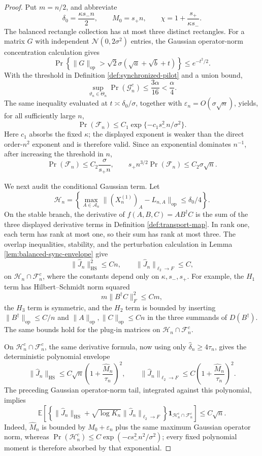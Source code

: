 \documentclass{article}
\begin{document}
\begin{proof}
Put \(m=n/2\), and abbreviate
\[
\delta_0=\frac{\kappa s_-n}{2},
\qquad
M_0=s_+n,
\qquad
\chi=1+\frac{s_+}{\kappa s_-}.
\]
The balanced rectangle collection has at most three distinct rectangles.  For a matrix \(G\) with independent \(\mathcal N(0,2\sigma^2)\) entries, the Gaussian operator-norm concentration calculation gives
\[
\Pr\!\left\{\lVert G\rVert_{\mathrm{op}}>
\sqrt2\sigma(\sqrt a+\sqrt b+t)\right\}\le e^{-t^2/2}.
\]
With the threshold in Definition \ref{def:synchronized-pilot} and a union bound,
\[
\sup_{\vartheta_n\in\Theta_n}\Pr(\mathcal G_n^c)
\le\frac{3\alpha}{16}<\frac{\alpha}{4}.
\]
The same inequality evaluated at \(t\asymp\delta_0/\sigma\), together with
\(\varepsilon_n=O(\sigma\sqrt n)\), yields, for all sufficiently large \(n\),
\[
\Pr(\mathcal F_n)
\le C_1\exp\{-c_1s_-^2n/\sigma^2\}.
\]
Here \(c_1\) absorbs the fixed \(\kappa\); the displayed exponent is weaker than the direct order-\(n^2\) exponent and is therefore valid.  Since an exponential dominates \(n^{-1}\), after increasing the threshold in \(n\),
\[
\Pr(\mathcal F_n)\le C_2\frac{\sigma}{s_+n},
\qquad
s_+n^{3/2}\Pr(\mathcal F_n)\le C_2\sigma\sqrt n.
\]

We next audit the conditional Gaussian term.  Let
\[
\mathcal H_n=
\left\{\max_{A\in\mathcal A_n}
\lVert(X_n^{(1)})_A-L_{n,A}\rVert_{\mathrm{op}}
\le\delta_0/4\right\}.
\]
On the stable branch, the derivative of
\(f(A,B,C)=AB^{\dagger}C\) is the sum of the three displayed derivative terms in Definition \ref{def:transport-map}.  In rank one, each term has rank at most one, so their sum has rank at most three.  The overlap inequalities, stability, and the perturbation calculation in Lemma \ref{lem:balanced-sync-envelope} give
\[
\lVert\widehat J_n\rVert_{\mathrm{HS}}^2\le Cn,
\qquad
\lVert\widehat J_n\rVert_{\ell_2\to F}\le C,
\]
on \(\mathcal H_n\cap\mathcal F_n^c\), where the constants depend only on
\(\kappa,s_-,s_+\).  For example, the \(H_1\) term has Hilbert--Schmidt norm squared
\[
m\lVert B^{\dagger}C\rVert_F^2\le Cm,
\]
the \(H_3\) term is symmetric, and the \(H_2\) term is bounded by inserting
\(\lVert B^{\dagger}\rVert_{\mathrm{op}}\le C/n\) and
\(\lVert A\rVert_{\mathrm{op}},\lVert C\rVert_{\mathrm{op}}\le Cn\)
in the three summands of \(D(B^{\dagger})\).  The same bounds hold for the plug-in matrices on \(\mathcal H_n\cap\mathcal F_n^c\).

On \(\mathcal H_n^c\cap\mathcal F_n^c\), the same derivative formula, now using only
\(\widehat\delta_n\ge4\tau_n\), gives the deterministic polynomial envelope
\[
\lVert\widehat J_n\rVert_{\mathrm{HS}}
\le C\sqrt n\left(1+\frac{\widehat M_n}{\tau_n}\right)^2,
\qquad
\lVert\widehat J_n\rVert_{\ell_2\to F}
\le C\left(1+\frac{\widehat M_n}{\tau_n}\right)^2.
\]
The preceding Gaussian operator-norm tail, integrated against this polynomial, implies
\[
\mathbb E\!\left[
\left\{\lVert\widehat J_n\rVert_{\mathrm{HS}}
+\sqrt{\log K_n}\lVert\widehat J_n\rVert_{\ell_2\to F}\right\}
\mathbf1_{\mathcal H_n^c\cap\mathcal F_n^c}\right]
\le C\sqrt n.
\]
Indeed, \(\widehat M_n\) is bounded by \(M_0+\varepsilon_n\) plus the same maximum Gaussian operator norm, whereas
\(\Pr(\mathcal H_n^c)\le C\exp(-c s_-^2n^2/\sigma^2)\); every fixed polynomial moment is therefore absorbed by that exponential.


\end{proof}
\end{document}
